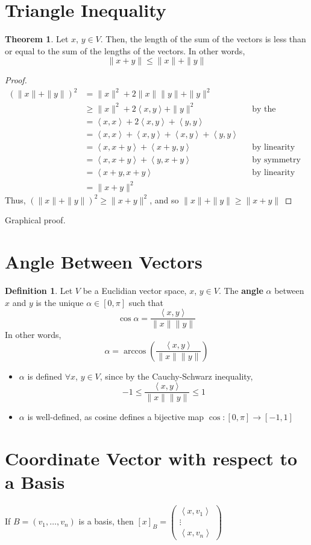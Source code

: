 \documentclass[letterpaper,12pt]{article}
\theoremstyle{definition}
\newtheorem*{definition}{Definition}
\newtheorem*{theorem}{Theorem}
\newcommand{\inp}[2]{\left< #1, #2 \right>}
\newcommand{\norm}[1]{\| #1 \|}
\begin{document}
\section*{Triangle Inequality}
\begin{theorem}
Let $x$, $y \in V$. Then, the length of the sum of the vectors is less than or equal to the sum of the lengths of the vectors. In other words,
\begin{equation*}
    \boxed{\norm{x + y} \leq \norm{x} + \norm{y}}
\end{equation*}
\end{theorem}
\begin{proof}
\begin{align*}
    (\norm{x} + \norm{y})^2 & = \norm{x}^2 + 2 \|x\| \|y\| + \norm{y}^2 \\
    & \geq \norm{x}^2 + 2 \inp{x}{y} + \norm{y}^2 && \text{by the Cauchy-Schwartz inequality} \\
    & = \inp{x}{x} + 2 \inp{x}{y} + \inp{y}{y} \\
    & = \inp{x}{x} + \inp{x}{y} + \inp{x}{y} + \inp{y}{y} \\
    & = \inp{x}{x+y} + \inp{x+y}{y} && \text{by linearity} \\
    & = \inp{x}{x+y} + \inp{y}{x+y} && \text{by symmetry} \\
    & = \inp{x+y}{x+y} && \text{by linearity} \\
    & = \norm{x+y}^2
\end{align*}
Thus, $(\norm{x} + \norm{y})^2 \geq \norm{x+y}^2$, and so $\norm{x} + \norm{y} \geq \norm{x+y}$
\end{proof}
Graphical proof.

\section*{Angle Between Vectors}
\begin{definition}
Let $V$ be a Euclidian vector space, $x$, $y \in V$. The \textbf{angle} $\alpha$ between $x$ and $y$ is the unique $\alpha \in [0, \pi]$ such that
\begin{equation*}
    \cos{\alpha} = \dfrac{\inp{x}{y}}{\norm{x} \norm{y}}
\end{equation*}
In other words,
\begin{equation*}
    \alpha = \arccos{\left(\dfrac{\inp{x}{y}}{\norm{x} \norm{y}} \right)}
\end{equation*}
\begin{itemize}
    \item $\alpha$ is defined $\forall x$, $y \in V$, since by the Cauchy-Schwarz inequality,
    \begin{equation*}
        -1 \leq \dfrac{\inp{x}{y}}{\norm{x} \norm{y}} \leq 1
    \end{equation*}
    \item $\alpha$ is well-defined, as cosine defines a bijective map $\cos{}: [0, \pi] \rightarrow [-1,1]$
\end{itemize}
\end{definition}


\section*{Coordinate Vector with respect to a Basis}
If $B = (v_1, \dots, v_n)$ is a basis, then $[x]_B = \begin{pmatrix} \inp{x}{v_1} \\ \vdots \\ \inp{x}{v_n} \end{pmatrix}$
\end{document}
